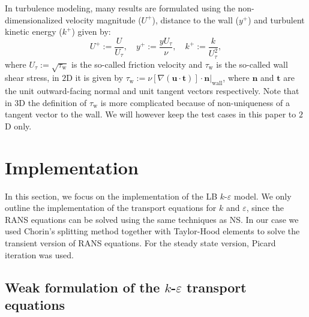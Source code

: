 In turbulence modeling, many results are formulated using the non-dimensionalized velocity magnitude (\(U^+\)), distance to the wall (\(y^+\)) and turbulent kinetic energy (\(k^+\)) given by:
\begin{equation}\label{eq: non-dimensionalized variables}
    U^+ := \frac{U}{U_\tau},
    \quad
    y^+ := \frac{y U_\tau}{\nu},
    \quad
    k^+ := \frac{k}{U_\tau^2},
\end{equation}
where \(U_\tau := \sqrt{\tau_\text{w}}\) is the so-called friction velocity and \(\tau_\text{w}\) is the so-called wall shear stress, in \(2\)D it is given by \( \tau_\text{w} := \left. \nu [\nabla (\mathbf{u} \cdot \mathbf{t})] \cdot \mathbf{n} \right\rvert_\text{wall} \), where \(\mathbf{n}\) and \(\mathbf{t}\) are the unit outward-facing normal and unit tangent vectors respectively. Note that in \(3\)D the definition of \(\tau_\text{w}\) is more complicated because of non-uniqueness of a tangent vector to the wall. We will however keep the test cases in this paper to \(2\)D only.

\section{Implementation}

In this section, we focus on the implementation of the LB \(k\)-\(\varepsilon\) model. We only outline the implementation of the transport equations for \(k\) and \(\varepsilon\), since the RANS equations can be solved using the same techniques as NS. In our case we used Chorin's splitting method together with Taylor-Hood elements to solve the transient version of RANS equations. For the steady state version, Picard iteration was used. 

\subsection{Weak formulation of the \texorpdfstring{\(k\)-\(\varepsilon\)}{k-e} transport equations}

